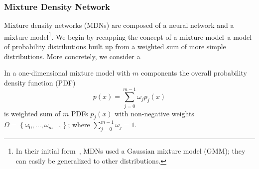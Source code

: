 \subsubsection{Mixture Density Network}\label{sec:DL_MDN}

Mixture density networks (MDNs) are composed of a neural network and a mixture model\footnote{In their initial form~\cite{bishop_mdn}, MDNs used a Gaussian mixture model (GMM); they can  easily be generalized to other distributions.}. We begin by recapping the concept of a mixture model--a model of probability distributions built up from a weighted sum of more simple distributions. More concretely, we consider a 

In a one-dimensional mixture model with $m$ components the overall probability density function (PDF) 
\[
p(x)=\sum_{j=0}^{m-1} \omega_{j} p_{j}(x)
\]
is weighted sum of $m$ PDFs $p_{j}(x)$ with non-negative weights $\Omega=\left\{\omega_{0}, \ldots, \omega_{m-1}\right\}$; where $\sum_{j=0}^{m-1} \omega_{j}=1$.

